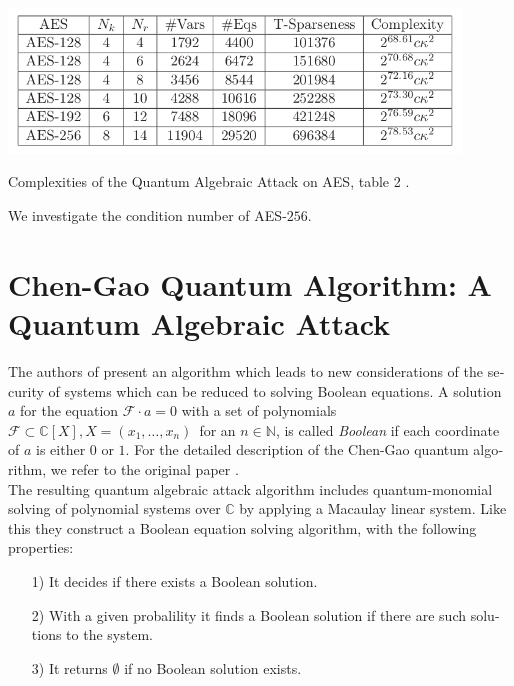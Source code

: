 \documentclass[a4paper,11pt]{article}
\begin{document}
\begin{otherlanguage}{english}
\begin{figurehere}
  \centering
  \includegraphics[width=12cm]{AES_table.png}
  \caption{Complexities of the Quantum Algebraic Attack on AES, table 2 \cite{QAA}.\label{abb_1}}
\end{figurehere}

\vspace{0.3cm} 
We investigate the condition number of \textsc{AES}-$256$. \\ 



\section{Chen-Gao Quantum Algorithm: A Quantum Algebraic Attack}

\noindent
The authors of \cite{QAA} present an algorithm which leads to new considerations of the security of systems which can be reduced to solving Boolean equations. A solution $a$ for the equation $\mathcal{F} \cdot a = 0$ with a set of polynomials $\mathcal{F} \subset \mathbb{C}[X], X = (x_1, \ldots, x_n) \,$ for an $ n \in \mathbb{N}$, is called \textit{Boolean} if each coordinate of $a$ is either $0$ or $1$. For the detailed description of the Chen-Gao quantum algorithm, we refer to the original paper \cite{QAA}.\\

\noindent
The resulting quantum algebraic attack algorithm includes quantum-monomial solving of polynomial systems over $\mathbb{C}$ by applying a Macaulay linear system. Like this they construct a Boolean equation solving algorithm, with the following properties: \\

\begin{itemize} [noitemsep, nolistsep]
  \item[1)] It decides if there exists a Boolean solution.
  \vspace{0.1cm}
  \item[2)] With a given probalility it finds a Boolean solution if there are such solutions to the system.
  \vspace{0.1cm}
  \item[3)] It returns $\emptyset$ if no Boolean solution exists.
\end{itemize}
\vspace{0.5cm}


\end{otherlanguage}
\end{document}
